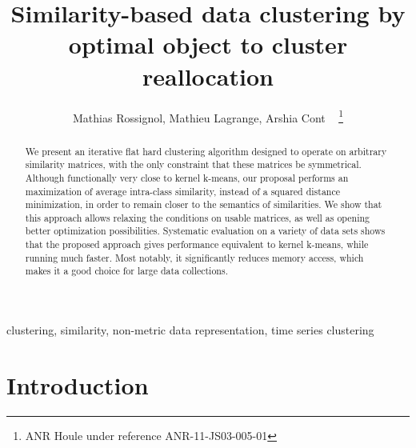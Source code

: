 \documentclass[10pt,journal,compsoc]{IEEEtran}
\begin{document}

\title{Similarity-based data clustering by optimal object to cluster reallocation}

\author{Mathias Rossignol, Mathieu Lagrange, Arshia Cont ~ \thanks{ANR Houle under reference ANR-11-JS03-005-01}}


\maketitle


\begin{abstract}

We present an iterative flat hard clustering algorithm designed to operate on arbitrary similarity matrices, with the only constraint that these matrices be symmetrical. Although functionally very close to kernel k-means, our proposal performs an maximization of average intra-class similarity, instead of a squared distance minimization, in order to remain closer to the semantics of similarities. We show that this approach allows relaxing the conditions on usable matrices, as well as opening better optimization possibilities. Systematic evaluation on a variety of data sets shows that the proposed approach gives performance equivalent to kernel k-means, while running much faster. Most notably, it significantly reduces memory access, which makes it a good choice for large data collections.

\end{abstract}

\begin{IEEEkeywords}
clustering, similarity, non-metric data representation, time series clustering
\end{IEEEkeywords}


\section{Introduction}
\end{document}
